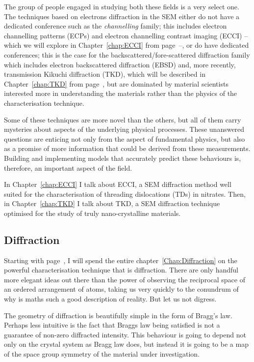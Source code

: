 The group of people engaged in studying both these fields is a very select one. The techniques based on electrons diffraction in the SEM either do not have a dedicated conference such as the \textit{channelling} family; this includes electron channelling patterns (ECPs) and electron channelling contrast imaging (ECCI) -- which we will explore in Chapter~\ref{chap:ECCI} from page~\pageref{chap:ECCI}--, or do have dedicated conferences; this is the case for the backscattered/fore-scattered diffraction family which includes electron backscattered diffraction (EBSD) and, more recently, transmission Kikuchi diffraction (TKD), which will be described in Chapter~\ref{chap:TKD} from page~\pageref{chap:TKD}, but are dominated by material scientists interested more in understanding the materials rather than the physics of the characterisation technique. 



Some of these techniques are more novel than the others, but all of them carry mysteries about aspects of the underlying physical processes. These unanswered questions are enticing not only from the aspect of fundamental physics, but also as a promise of more information that could be derived from these measurements. Building and implementing models that accurately predict these behaviours is, therefore, an important aspect of the field. 

In Chapter~\ref{chap:ECCI} I talk about ECCI, a SEM diffraction method  well suited for the characterisation of threading dislocations (TDs) in nitrates. Then, in Chapter~\ref{chap:TKD} I talk about TKD, a SEM diffraction technique optimised for the study of truly nano-crystalline materials.  





\subsection{Diffraction}

Starting with page~\pageref{Chap:Diffraction}, I will spend the entire chapter~\ref{Chap:Diffraction} on the powerful characterisation technique that is diffraction. There are only handful more elegant ideas out there than the power of observing the reciprocal space of an ordered arrangement of atoms, taking us very quickly to the conundrum of why is maths such a good description of reality.  But let us not digress. 

The geometry of diffraction is beautifully simple in the form of Bragg's law. Perhaps less intuitive is the fact that Braggs law being satisfied is not a guarantee of non-zero diffracted intensity. This behaviour is going to depend not only on the crystal system as Bragg law does, but instead it is going to be a map of the space group symmetry of the material under investigation. 

